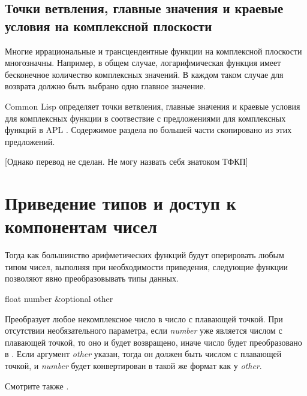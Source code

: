 \subsection{Точки ветвления, главные значения и краевые условия на комплексной плоскости}
\label{BRANCH-CUTS-SECTION}

Многие иррациональные и трансцендентные функции на комплексной
плоскости многозначны. Например, в общем случае, логарифмическая функция имеет 
бесконечное количество комплексных значений. В каждом таком случае для возврата 
должно быть выбрано одно главное значение.

Common Lisp определяет точки ветвления, главные значения и краевые условия для
комплексных функции в соотвествие с предложениями для комплексных функций в APL
\cite{APL-BRANCH-CUTS}.
Содержимое раздела по большей части скопировано из этих предложений.

[Однако перевод не сделан. Не могу назвать себя знатоком ТФКП]


\section{Приведение типов и доступ к компонентам чисел}

Тогда как большинство арифметических функций будут оперировать любым типом
чисел, выполняя при необходимости приведения, следующие функции позволяют явно
преобразовывать типы данных.

\begin{defun}[Функция]
float number &optional other

Преобразует любое некомплексное число в число с плавающей точкой.
При отсутствии необязательного параметра, если \emph{number} уже
является числом с плавающей точкой, то оно и будет возвращено, иначе число будет
преобразовано в .
Если аргумент \emph{other} указан, тогда он должен быть числом с плавающей
точкой, и \emph{number} будет конвертирован в такой же формат как у
\emph{other}.

Смотрите также .
\end{defun}

